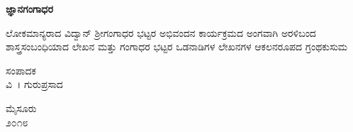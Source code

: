 {\fontsize{14}{16}\selectfont
\thispagestyle{empty}
\centerline{{\fontsize{40}{42}\bfseries ಜ್ಞಾನಗಂಗಾಧರ}}
\bigskip
\begin{center}
{\large ಲೋಕಮಾನ್ಯರಾದ ವಿದ್ವಾನ್ ಶ್ರೀಗಂಗಾಧರ ಭಟ್ಟರ ಅಭಿವಂದನ ಕಾರ್ಯಕ್ರಮದ
ಅಂಗವಾಗಿ ಅರಳಿಬಂದ ಶಾಸ್ತ್ರಸಂಬಂಧಿಯಾದ ಲೇಖನ
ಮತ್ತು ಗಂಗಾಧರ ಭಟ್ಟರ ಒಡನಾಡಿಗಳ ಲೇಖನಗಳ
ಆಕಲನರೂಪದ ಗ್ರಂಥಕುಸುಮ}
\end{center}
\vfill

\begin{center}
{\large ಸಂಪಾದಕ\\
ವಿ~। ಗುರುಪ್ರಸಾದ}
\end{center}
\vfill
\begin{center}
\bigskip
{\large ಮೈಸೂರು\\
\smallskip
೨೦೧೮}
\end{center}
}
